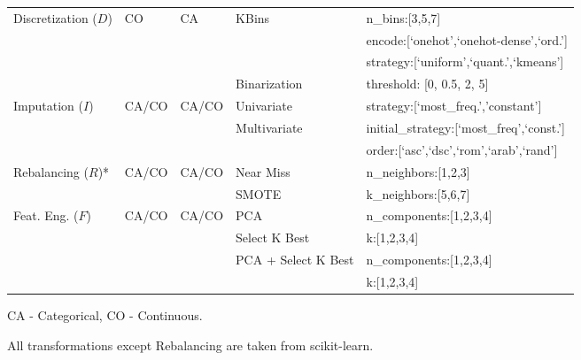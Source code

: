 \begin{example}
\begin{table}[!t]
\begin{threeparttable}
\begin{tabular}{@{}p{30mm}lll>{\ttfamily}l@{}}
Discretization ($D$) & CO & CA & KBins & n\_bins:[3,5,7]\\ \cmidrule[.05em]{4-5} & & & & encode:[`onehot',`onehot-dense',`ord.']\\ \cmidrule[.05em]{4-5} & & & & strategy:[`uniform',`quant.',`kmeans']\\	\cmidrule[.05em]{4-5}
&  &  & Binarization  & threshold: [0, 0.5, 2, 5]\\	\cmidrule[.1em]{1-5}

Imputation ($I$) & CA/CO & CA/CO  & Univariate & strategy:[`most\_freq.','constant'] \\	\cmidrule[.05em]{4-5}
 & &  & Multivariate & initial\_strategy:[`most\_freq',`const.']\\ \cmidrule[.05em]{4-5} & & & & order:[`asc',`dsc',`rom',`arab',`rand'] \\	\cmidrule[.1em]{1-5}

Rebalancing ($R$)* &CA/CO  & CA/CO & Near Miss & n\_neighbors:[1,2,3]\\ \cmidrule[.05em]{4-5}
&  &  & SMOTE & k\_neighbors:[5,6,7]\\	\cmidrule[.1em]{1-5}

Feat. Eng. ($F$) & CA/CO & CA/CO & PCA & n\_components:[1,2,3,4]\\ \cmidrule[.05em]{4-5}
&  &  & Select K Best & k:[1,2,3,4]\\ \cmidrule[.05em]{4-5}
&  &  & PCA + Select K Best  & n\_components:[1,2,3,4]
\\ \cmidrule[.05em]{4-5} & & & & k:[1,2,3,4]\\	\bottomrule%
\end{tabular}
\begin{tablenotes}
\footnotesize
\item CA - Categorical, CO - Continuous.
\item *All transformations except Rebalancing are taken from scikit-learn.
\end{tablenotes}
\end{threeparttable}
\label{tbl:transformations}
\end{table}


\end{example}
